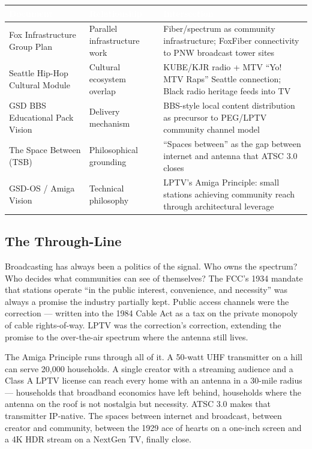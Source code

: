 \documentclass[11pt,letterpaper]{article}
\newcommand{\tableheader}[1]{\textbf{\sffamily\textcolor{white}{#1}}}
\begin{document}
\begin{center}
\begin{tabularx}{\textwidth}{L{4cm}L{4cm}X}
\toprule
{}
\tableheader{Document} & \tableheader{Relationship} & \tableheader{Intersection} \\
\midrule
Fox Infrastructure Group Plan & Parallel infrastructure work & Fiber/spectrum as community infrastructure; FoxFiber connectivity to PNW broadcast tower sites \\
Seattle Hip-Hop Cultural Module & Cultural ecosystem overlap & KUBE/KJR radio + MTV ``Yo! MTV Raps'' Seattle connection; Black radio heritage feeds into TV \\
GSD BBS Educational Pack Vision & Delivery mechanism & BBS-style local content distribution as precursor to PEG/LPTV community channel model \\
The Space Between (TSB) & Philosophical grounding & ``Spaces between'' as the gap between internet and antenna that ATSC 3.0 closes \\
GSD-OS / Amiga Vision & Technical philosophy & LPTV's Amiga Principle: small stations achieving community reach through architectural leverage \\
\bottomrule
\end{tabularx}
\end{center}

\subsection{The Through-Line}

Broadcasting has always been a politics of the signal. Who owns the spectrum? Who decides what communities can see of themselves? The FCC's 1934 mandate that stations operate ``in the public interest, convenience, and necessity'' was always a promise the industry partially kept. Public access channels were the correction --- written into the 1984 Cable Act as a tax on the private monopoly of cable rights-of-way. LPTV was the correction's correction, extending the promise to the over-the-air spectrum where the antenna still lives.

The Amiga Principle runs through all of it. A 50-watt UHF transmitter on a hill can serve 20,000 households. A single creator with a streaming audience and a Class A LPTV license can reach every home with an antenna in a 30-mile radius --- households that broadband economics have left behind, households where the antenna on the roof is not nostalgia but necessity. ATSC 3.0 makes that transmitter IP-native. The spaces between internet and broadcast, between creator and community, between the 1929 ace of hearts on a one-inch screen and a 4K HDR stream on a NextGen TV, finally close.
\end{document}
